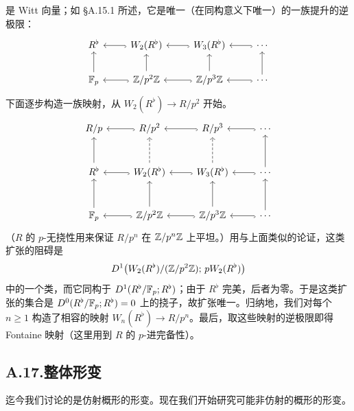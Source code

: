 是 Witt 向量；如 §A.15.1 所述，它是唯一（在同构意义下唯一）的一族提升的逆极限：
\[
\begin{tikzcd}
R^\flat & W_2(R^\flat) \arrow[l, hook] & W_3(R^\flat) \arrow[l, hook] & \cdots \arrow[l, hook] \\
\F_p \arrow[u] & \Z/p^2\Z \arrow[u] \arrow[l, hook] & \Z/p^3\Z \arrow[u] \arrow[l, hook] & \cdots \arrow[u] \arrow[l, hook]
\end{tikzcd}
\]
下面逐步构造一族映射，从 $W_2(R^\flat)\to R/p^2$ 开始。
\[
\begin{tikzcd}[row sep=large]
R/p & R/p^2 \arrow[l, hook] & R/p^3 \arrow[l, hook] & \cdots \arrow[l, hook] \\
R^\flat \arrow[u] & W_2(R^\flat) \arrow[u, dashed] \arrow[l, hook] & W_3(R^\flat) \arrow[u, dashed] \arrow[l, hook] & \cdots \arrow[u] \arrow[l, hook] \\
\F_p \arrow[u] & \Z/p^2\Z \arrow[u] \arrow[l, hook] & \Z/p^3\Z \arrow[u] \arrow[l, hook] & \cdots \arrow[u] \arrow[l, hook]
\end{tikzcd}
\]
（$R$ 的 $p$-无挠性用来保证 $R/p^n$ 在 $\mathbb{Z}/p^n\mathbb{Z}$ 上平坦。）用与上面类似的论证，这类扩张的阻碍是
\[
D^1\bigl(W_2(R^\flat)/(\mathbb{Z}/p^2\mathbb{Z});\,pW_2(R^\flat)\bigr)
\]
中的一个类，而它同构于 $D^1(R^\flat/\mathbb{F}_p;R^\flat)$；由于 $R^\flat$ 完美，后者为零。于是这类扩张的集合是 $D^0(R^\flat/\mathbb{F}_p;R^\flat)=0$ 上的挠子，故扩张唯一。归纳地，我们对每个 $n\ge1$ 构造了相容的映射 $W_n(R^\flat)\to R/p^n$。最后，取这些映射的逆极限即得 Fontaine 映射（这里用到 $R$ 的 $p$-进完备性）。

\subsection*{A.17.\quad 整体形变}

迄今我们讨论的是仿射概形的形变。现在我们开始研究可能非仿射的概形的形变。

